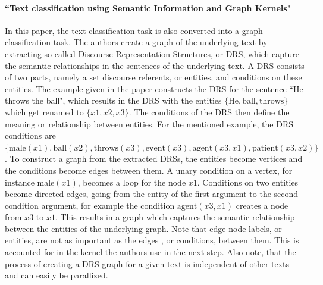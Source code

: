 \paragraph{``Text classification using Semantic Information and Graph Kernels" \cite{Gaspar2011}}
In this paper, the text classification task is also converted into a graph classification task.
The authors create a graph of the underlying text by extracting so-called \underline{D}iscourse \underline{R}epresentation \underline{S}tructures, or DRS, which capture the semantic relationships in the sentences of the underlying text.
A DRS consists of two parts, namely a set discourse referents, or entities, and conditions on these entities.
The example given in the paper constructs the DRS for the sentence ``He throws the ball", which results in the DRS with the entities $\{\text{He}, \text{ball}, \text{throws}\}$ which get renamed to $\{x1, x2, x3\}$.
The conditions of the DRS then define the meaning or relationship between entities.
For the mentioned example, the DRS conditions are $\{\text{male}(x1), \text{ball}(x2), \text{throws}(x3), \text{event}(x3), \text{agent}(x3, x1), \text{patient}(x3, x2)\}$.
To construct a graph from the extracted DRSs, the entities become vertices and the conditions become edges between them.
A unary condition on a vertex, for instance $\text{male}(x1)$, becomes a loop for the node $x1$.
Conditions on two entities become directed edges, going from the entity of the first argument to the second condition argument, for example the condition $\text{agent}(x3, x1)$ creates a node from $x3$ to $x1$.
This results in a graph which captures the semantic relationship between the entities of the underlying graph.
Note that edge node labels, or entities, are not as important as the edges , or conditions, between them.
This is accounted for in the kernel the authors use in the next step.
Also note, that the process of creating a DRS graph for a given text is independent of other texts and can easily be parallized.

